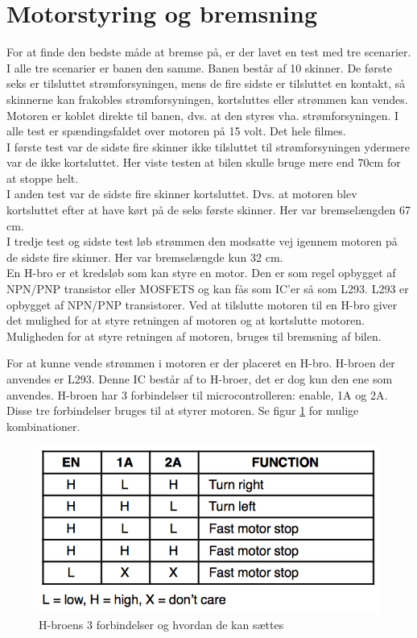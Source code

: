 \section{Motorstyring og bremsning}
For at finde den bedste måde at bremse på, er der lavet en test med tre scenarier. I alle tre scenarier er banen den samme. Banen består af 10 skinner. De første seks er tilsluttet strømforsyningen, mens de fire sidste er tilsluttet en kontakt, så skinnerne kan frakobles strømforsyningen, kortsluttes eller strømmen kan vendes. Motoren er koblet direkte til banen, dvs. at den styres vha. strømforsyningen. I alle test er spændingsfaldet over motoren på 15 volt. Det hele filmes. \\

I første test var de sidste fire skinner ikke tilsluttet til strømforsyningen ydermere var de ikke kortsluttet. Her viste testen at bilen skulle bruge mere end 70cm for at stoppe helt. \\
I anden test var de sidste fire skinner kortsluttet. Dvs. at motoren blev kortsluttet efter at have kørt på de seks første skinner. Her var bremselængden 67 cm. \\
I tredje test og sidste test løb strømmen den modsatte vej igennem motoren på de sidste fire skinner. Her var bremselængde kun 32 cm. \\

En H-bro er et kredsløb som kan styre en motor. Den er som regel opbygget af NPN/PNP transistor eller MOSFETS og kan fås som IC'er så som L293. L293 er opbygget af NPN/PNP transistorer. Ved at tilslutte motoren til en H-bro giver det mulighed for at styre retningen af motoren og at kortslutte motoren. Muligheden for at styre retningen af motoren, bruges til bremsning af bilen.

For at kunne vende strømmen i motoren er der placeret en H-bro. H-broen der anvendes er L293. Denne IC består af to H-broer, det er dog kun den ene som anvendes. H-broen har 3 forbindelser til microcontrolleren: enable, 1A og 2A. Disse tre forbindelser bruges til at styrer motoren. Se figur \ref{hbro_forbindelse} for mulige kombinationer. 

\begin{figure}[h!]
\center
\includegraphics[scale=0.35]{./Graphics/h-bro_forbindelse.png}
\caption{H-broens 3 forbindelser og hvordan de kan sættes}
\label{hbro_forbindelse}
\end{figure}

